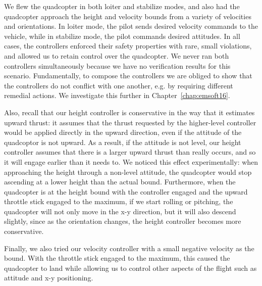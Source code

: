 We flew the quadcopter in both loiter and stabilize modes, and also had the
quadcopter approach the height and velocity bounds from a variety of
velocities and orientations. In loiter mode, the pilot sends desired
velocity commands to the vehicle, while in stabilize mode, the pilot
commands desired attitudes. In all cases, the controllers enforced their
safety properties with rare, small violations, and allowed us to retain
control over the quadcopter.  We never ran both controllers simultaneously
because we have no verification results for this scenario.  Fundamentally,
to compose the controllers we are obliged to show that the controllers do
not conflict with one another, e.g. by requiring different remedial
actions. We investigate this further in Chapter~\ref{chap:emsoft16}.

Also, recall that our height controller is conservative in the way that it
estimates upward thrust: it assumes that the thrust requested by the
higher-level controller would be applied directly in the upward direction,
even if the attitude of the quadcoptor is not upward.  As a result, if the
attitude is not level, our height controller assumes that there is a larger
upward thrust than really occurs, and so it will engage earlier than it
needs to.  We noticed this effect experimentally: when approaching the
height through a non-level attitude, the quadcopter would stop ascending at
a lower height than the actual bound.  Furthermore, when the quadcopter is
at the height bound with the controller engaged and the upward throttle
stick engaged to the maximum, if we start rolling or pitching, the
quadcopter will not only move in the x-y direction, but it will also
descend slightly, since as the orientation changes, the height controller
becomes more conservative.

Finally, we also tried our velocity controller with a small negative
velocity as the bound. With the throttle stick engaged to the maximum, this
caused the quadcopter to land while allowing us to control other aspects of
the flight such as attitude and x-y positioning.

